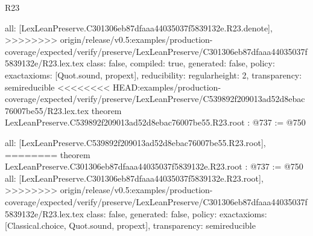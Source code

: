 \begin{lexlean}{R23}
\begin{coremodule}
{{{{{  all: [LexLeanPreserve.C301306eb87dfaaa44035037f5839132e.R23.denote],
>>>>>>>> origin/release/v0.5:examples/production-coverage/expected/verify/preserve/LexLeanPreserve/C301306eb87dfaaa44035037f5839132e/R23.lex.tex
  class: false,
  compiled: true,
  generated: false,
  policy: exact{axioms: [Quot.sound, propext]},
  reducibility: regular{height: 2},
  transparency: semireducible
}
<<<<<<<< HEAD:examples/production-coverage/expected/verify/preserve/LexLeanPreserve/C539892f209013ad52d8ebac76007be55/R23.lex.tex
theorem LexLeanPreserve.C539892f209013ad52d8ebac76007be55.R23.root : @737 := @750 {
  all: [LexLeanPreserve.C539892f209013ad52d8ebac76007be55.R23.root],
========
theorem LexLeanPreserve.C301306eb87dfaaa44035037f5839132e.R23.root : @737 := @750 {
  all: [LexLeanPreserve.C301306eb87dfaaa44035037f5839132e.R23.root],
>>>>>>>> origin/release/v0.5:examples/production-coverage/expected/verify/preserve/LexLeanPreserve/C301306eb87dfaaa44035037f5839132e/R23.lex.tex
  class: false,
  generated: false,
  policy: exact{axioms: [Classical.choice, Quot.sound, propext]},
  transparency: semireducible
}

}}}}}
\end{coremodule}
\end{lexlean}
